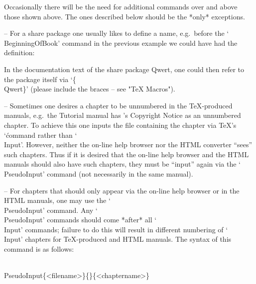 \indextt{\\PseudoInput}
Occasionally there will be the need  for  additional  commands  over  and
above those shown above. The ones described below should  be  the  *only*
exceptions.
\beginlist

\item{--}
For a share package one usually likes to define a name,  e.g.~before  the
`\\BeginningOfBook' command in the previous example we could have had the
definition:
\begintt
\def\Qwert{{\sf Qwert}}
\endtt

\item{}
In the documentation text of the share package  {\sf  Qwert},  one  could
then refer to the package itself via `\{\\Qwert\}'  (please  include  the
braces -- see "TeX Macros").

\item{--}
Sometimes one desires a chapter to be unnumbered in  the  {\TeX}-produced
manuals, e.g.~the Tutorial manual has {\GAP}'s  Copyright  Notice  as  an
unnumbered chapter. To achieve this one inputs the  file  containing  the
chapter via {\TeX}'s `\' command rather  than  `\\Input'.  However,
neither the on-line help browser nor the  HTML  converter  ``sees''  such
chapters. Thus if it is desired that the on-line  help  browser  and  the
HTML manuals should also have such chapters, they must be ``input'' again
via the `\\PseudoInput' command (not necessarily in the same manual).

\item{--}
For chapters that should only appear via the on-line help browser  or  in
the  HTML  manuals,  one  may  use  the  `\\PseudoInput'   command.   Any
`\\PseudoInput'  commands should come  *after*  all  `\\Input'  commands;
failure to do this  will  result  in  different  numbering  of  `\\Input'
chapters for {\TeX}-produced and HTML manuals. The syntax of this command
is as follows:

\)\\PseudoInput\{<filename>\}\{<six-entry>\}\{<chaptername>\}

